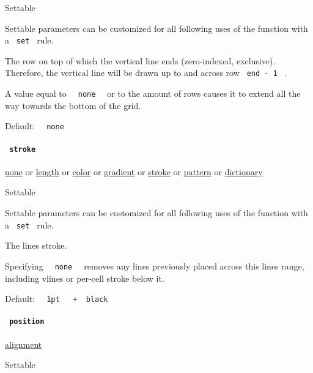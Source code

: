 {{ Settable }}

\label{definitions-vline-end-settable-tooltip}
Settable parameters can be customized for all following uses of the
function with a \texttt{\ set\ } rule.

The row on top of which the vertical line ends (zero-indexed,
exclusive). Therefore, the vertical line will be drawn up to and across
row \texttt{\ end\ -\ 1\ } .

A value equal to \texttt{\ }{\texttt{\ none\ }}\texttt{\ } or to the
amount of rows causes it to extend all the way towards the bottom of the
grid.

Default: \texttt{\ }{\texttt{\ none\ }}\texttt{\ }

\paragraph{\texorpdfstring{\texttt{\ stroke\ }}{ stroke }}\label{definitions-vline-stroke}

\href{/docs/reference/foundations/none/}{none} {or}
\href{/docs/reference/layout/length/}{length} {or}
\href{/docs/reference/visualize/color/}{color} {or}
\href{/docs/reference/visualize/gradient/}{gradient} {or}
\href{/docs/reference/visualize/stroke/}{stroke} {or}
\href{/docs/reference/visualize/pattern/}{pattern} {or}
\href{/docs/reference/foundations/dictionary/}{dictionary}

{{ Settable }}

\label{definitions-vline-stroke-settable-tooltip}
Settable parameters can be customized for all following uses of the
function with a \texttt{\ set\ } rule.

The line\textquotesingle s stroke.

Specifying \texttt{\ }{\texttt{\ none\ }}\texttt{\ } removes any lines
previously placed across this line\textquotesingle s range, including
vlines or per-cell stroke below it.

Default:
\texttt{\ }{\texttt{\ 1pt\ }}\texttt{\ }{\texttt{\ +\ }}\texttt{\ black\ }

\paragraph{\texorpdfstring{\texttt{\ position\ }}{ position }}\label{definitions-vline-position}

\href{/docs/reference/layout/alignment/}{alignment}

{{ Settable }}

